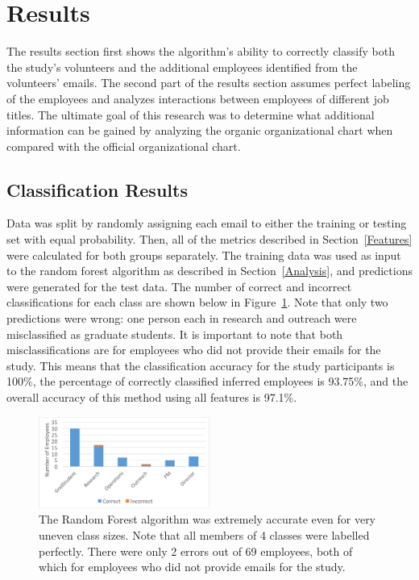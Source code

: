 \documentclass{article}
\begin{document}
\section{Results} \label{Results}

The results section first shows the algorithm's ability to correctly classify both the study's volunteers and the additional employees identified from the volunteers' emails.  The second part of the results section assumes perfect labeling of the employees and analyzes interactions between employees of different job titles.  The ultimate goal of this research was to determine what additional information can be gained by analyzing the organic organizational chart when compared with the official organizational chart.

\subsection{Classification Results}
Data was split by randomly assigning each email to either the training or testing set with equal probability.  Then, all of the metrics described in Section~\ref{Features} were calculated for both groups separately.  The training data was used as input to the random forest algorithm as described in Section~\ref{Analysis}, and predictions were generated for the test data.  The number of correct and incorrect classifications for each class are shown below in Figure~\ref{fig:result_hist}.  Note that only two predictions were wrong: one person each in research and outreach were misclassified as graduate students.  It is important to note that both  misclassifications are for employees who did not provide their emails for the study.  This means that the classification accuracy for the study participants is 100\%, the percentage of correctly classified inferred employees is 93.75\%, and the overall accuracy of this method using all features is 97.1\%.

\begin{figure}[H]
    \centering
        \includegraphics[width=0.5\textwidth]{Prediction_50_50_RF}
        \caption{The Random Forest algorithm was extremely accurate even for very uneven class sizes.  Note that all members of 4 classes were labelled perfectly.  There were only 2 errors out of 69 employees, both of which for employees who did not provide emails for the study.}
        \label{fig:result_hist}
\end{figure}
\end{document}
